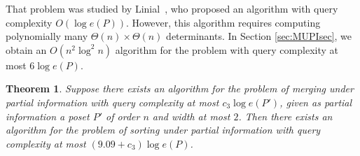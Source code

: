 \documentclass{article} \usepackage{fullpage}
\newtheorem{theorem}{Theorem}
\begin{document}
That problem was studied by Linial~\cite{L84}, who proposed an algorithm with query complexity $O(\log e(P))$. However, this algorithm requires computing polynomially many $\Theta (n)\times \Theta (n)$ determinants. In Section \ref{sec:MUPIsec}, we obtain an $O(n^2 \log^2 n)$ algorithm for the problem with query complexity at most $6 \log e(P)$. 

\begin{theorem}
\label{thm:mupired}
Suppose there exists an algorithm for the problem of merging under partial information with query complexity at most $c_3 \log e(P')$, given as partial information a poset $P'$ of order $n$ and width at most $2$. Then there exists an algorithm for the problem of sorting under partial information with query complexity at most $(9.09 + c_3) \log e(P)$.
\end{theorem}
\end{document}
